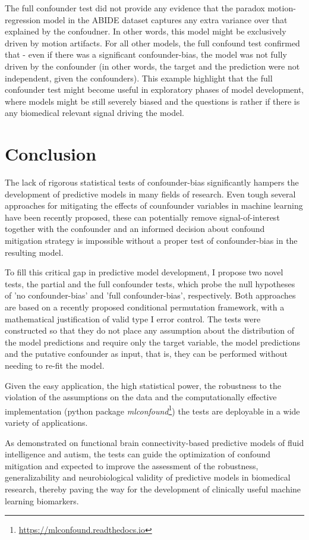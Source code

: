 \documentclass{article}
\begin{document}
The full confounder test did not provide any evidence that the paradox motion-regression model in the ABIDE dataset captures any extra variance over that explained by the confoudner. In other words, this model might be exclusively driven by motion artifacts.
For all other models, the full confound test confirmed that - even if there was a significant confounder-bias, the model was not fully driven by the confounder (in other words, the target and the prediction were not independent, given the confounders).
This example highlight that the full confounder test might become useful in exploratory phases of model development, where models might be still severely biased and the questions is rather if there is any biomedical relevant signal driving the model.


\section{Conclusion}

The lack of rigorous statistical tests of confounder-bias significantly hampers the development of predictive models in many fields of research. Even tough several approaches for mitigating the effects of counfounder variables in machine learning have been recently proposed, these can potentially remove signal-of-interest together with the confounder and an informed decision about confound mitigation strategy is impossible without a proper test of confounder-bias in the resulting model.

To fill this critical gap in predictive model development, I propose two novel tests, the partial and the full confounder tests, which probe the null hypotheses of 'no confounder-bias' and 'full confounder-bias', respectively. Both approaches are based on a recently proposed conditional permutation framework, with a mathematical justification of valid type I error control. The tests were constructed so that they do not place any assumption about the distribution of the model predictions and require only the target variable, the model predictions and the putative confounder as input, that is, they can be performed without needing to re-fit the model.

Given the easy application, the high statistical power, the robustness to the violation of the assumptions on the data and the computationally effective implementation (python package \emph{mlconfound}\footnote{\href{https://mlconfound.readthedocs.io}{https://mlconfound.readthedocs.io}}) the tests are deployable in a wide variety of applications.

As demonstrated on functional brain connectivity-based predictive models of fluid intelligence and autism, the tests can guide the optimization of confound mitigation and expected to improve the assessment of the robustness, generalizability and neurobiological validity of predictive models in biomedical research, thereby paving the way for the development of clinically useful machine learning biomarkers.

  


\newpage

\end{document}
